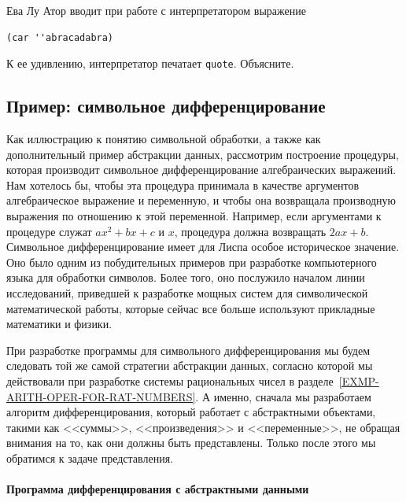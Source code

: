 \begin{exercise}{2.55}\label{EX2.55}%
Ева Лу Атор вводит при работе с интерпретатором
выражение

\begin{Verbatim}[fontsize=\small]
(car ''abracadabra)
\end{Verbatim}
К ее удивлению, интерпретатор печатает {\tt quote}.  Объясните.
\end{exercise}

\subsection{Пример: символьное дифференцирование}
\label{EXAMPLE-SYMBOLIC-DIFFERENTIATION}


Как иллюстрацию к понятию символьной
обработки, а также как дополнительный пример абстракции данных, 
рассмотрим построение процедуры,
которая производит символьное дифференцирование алгебраических
выражений.  Нам хотелось бы, чтобы эта процедура принимала в качестве
аргументов алгебраическое выражение и переменную, и чтобы она
возвращала производную выражения по отношению к этой переменной.
Например, если аргументами к процедуре служат $ax^2 + bx +
c$ и $x$, процедура должна возвращать $2ax +
b$.  Символьное дифференцирование имеет для Лиспа особое
историческое значение.  Оно было одним из побудительных примеров при
разработке компьютерного языка для обработки символов.  Более того,
оно послужило началом линии исследований, приведшей к разработке 
мощных систем для символической математической работы, которые сейчас
все больше используют прикладные математики и физики.

При разработке программы для символьного дифференцирования
мы будем следовать той же самой стратегии абстракции данных, согласно
которой мы действовали при разработке системы рациональных чисел в
разделе~\ref{EXMP-ARITH-OPER-FOR-RAT-NUMBERS}.
А именно, сначала мы разработаем алгоритм дифференцирования, который
работает с абстрактными объектами, такими как <<суммы>>,
<<произведения>> и <<переменные>>, не обращая внимания на то, как они
должны быть представлены.  Только после этого мы обратимся к задаче
представления.

\paragraph{Программа дифференцирования с абстрактными
данными}


